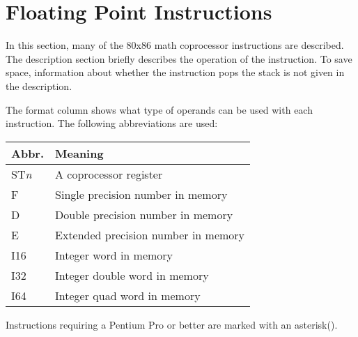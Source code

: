 \newpage
\section{Floating Point Instructions}

\renewcommand{\thefootnote}{\fnsymbol{footnote}} In this section, many
of the 80x86 math coprocessor instructions are described. The
description section briefly describes the operation of the
instruction. To save space, information about whether the instruction
pops the stack is not given in the description. 

The format column shows what type of operands can be used with each
instruction. The following abbreviations are used:
\begin{center}
\begin{tabular}{|l|l|}
\hline
Abbr.      & Meaning\\
\hline
ST\emph{n} & A coprocessor register \\
F          & Single precision number in memory \\
D          & Double precision number in memory \\
E          & Extended precision number in memory \\
I16        & Integer word in memory \\
I32        & Integer double word in memory \\
I64        & Integer quad word in memory \\
\hline
\end{tabular}
\end{center}

Instructions requiring a Pentium Pro or better are marked with an 
asterisk(\footnotemark[1]).


